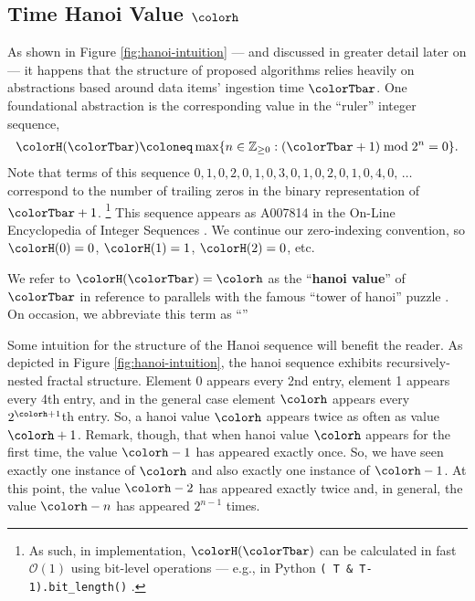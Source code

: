 \subsection{Time Hanoi Value $\colorh$}
\label{sec:notation-hanoi}



As shown in Figure \ref{fig:hanoi-intuition} --- and discussed in greater detail later on --- it happens that the structure of proposed algorithms relies heavily on abstractions based around data items' ingestion time $\colorTbar$.
One foundational abstraction is the corresponding value in the ``ruler'' integer sequence,
\begin{align}
\colorH(\colorTbar)
\coloneq
\max \{ n \in \mathbb{Z}_{\geq0} : (\colorTbar + 1) \bmod 2^n = 0 \}.
\label{eqn:hanoi-defn}
\end{align}
Note that terms of this sequence $0,\allowbreak 1,\allowbreak 0,\allowbreak 2,\allowbreak 0,\allowbreak 1,\allowbreak 0,\allowbreak 3,\allowbreak 0,\allowbreak 1,\allowbreak 0,\allowbreak 2,\allowbreak 0,\allowbreak 1,\allowbreak 0,\allowbreak 4,\allowbreak 0,\allowbreak \,\ldots$ correspond to the number of trailing zeros in the binary representation of $\colorTbar + 1$.%
\footnote{%
As such, in implementation, $\colorH(\colorTbar)$ can be calculated in fast $\mathcal{O}(1)$ using bit-level operations --- e.g., in Python \texttt{(~T \& T-1).bit\_length()} \citep{oeis}.
}
This sequence appears as A007814 in the On-Line Encyclopedia of Integer Sequences \citep{oeis}.
We continue our zero-indexing convention, so $\colorH(0) = 0$, $\colorH(1) = 1$, $\colorH(2) = 0$, etc.

We refer to $\colorH(\colorTbar) = \colorh$ as the ``\textbf{hanoi value}'' of $\colorTbar$ in reference to parallels with the famous ``tower of hanoi'' puzzle \citep{lucas1889jeux}.
On occasion, we abbreviate this term as ``\hv{}''

Some intuition for the structure of the Hanoi sequence will benefit the reader.
As depicted in Figure \ref{fig:hanoi-intuition}, the hanoi sequence exhibits recursively-nested fractal structure.
Element 0 appears every 2nd entry, element 1 appears every 4th entry, and in the general case element $\colorh$ appears every $2^{\colorh+1}$th entry.
So, a hanoi value $\colorh$ appears twice as often as value $\colorh + 1$.
Remark, though, that when hanoi value $\colorh$ appears for the first time, the value $\colorh - 1$ has appeared exactly once.
So, we have seen exactly one instance of $\colorh$ and also exactly one instance of $\colorh - 1$.
At this point, the value $\colorh - 2$ has appeared exactly twice and, in general, the value $\colorh - n$ has appeared $2^{n - 1}$ times.

